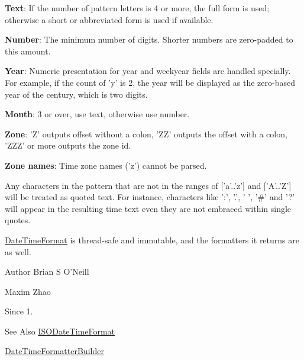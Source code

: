 {\bfseries Text}\-: If the number of pattern letters is 4 or more, the full form is used; otherwise a short or abbreviated form is used if available. 

{\bfseries Number}\-: The minimum number of digits. Shorter numbers are zero-\/padded to this amount. 

{\bfseries Year}\-: Numeric presentation for year and weekyear fields are handled specially. For example, if the count of 'y' is 2, the year will be displayed as the zero-\/based year of the century, which is two digits. 

{\bfseries Month}\-: 3 or over, use text, otherwise use number. 

{\bfseries Zone}\-: 'Z' outputs offset without a colon, 'Z\-Z' outputs the offset with a colon, 'Z\-Z\-Z' or more outputs the zone id. 

{\bfseries Zone names}\-: Time zone names ('z') cannot be parsed. 

Any characters in the pattern that are not in the ranges of \mbox{[}'a'..'z'\mbox{]} and \mbox{[}'A'..'Z'\mbox{]} will be treated as quoted text. For instance, characters like '\-:', '.', ' ', '\#' and '?' will appear in the resulting time text even they are not embraced within single quotes. 

\hyperlink{classorg_1_1joda_1_1time_1_1format_1_1_date_time_format}{Date\-Time\-Format} is thread-\/safe and immutable, and the formatters it returns are as well.

\begin{DoxyAuthor}{Author}
Brian S O'Neill 

Maxim Zhao 
\end{DoxyAuthor}
\begin{DoxySince}{Since}
1. 
\end{DoxySince}
\begin{DoxySeeAlso}{See Also}
\hyperlink{classorg_1_1joda_1_1time_1_1format_1_1_i_s_o_date_time_format}{I\-S\-O\-Date\-Time\-Format} 

\hyperlink{classorg_1_1joda_1_1time_1_1format_1_1_date_time_formatter_builder}{Date\-Time\-Formatter\-Builder} 
\end{DoxySeeAlso}


